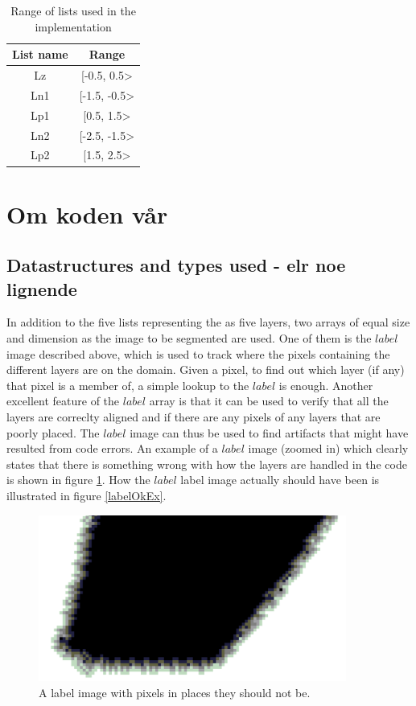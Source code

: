 \begin{table}[h] %
	\begin{tabular}{| c | c |} 
	\hline
	List name & Range\\
	\hline
	Lz & [-0.5, 0.5>\\
	Ln1 & [-1.5, -0.5>\\
	Lp1 & [0.5, 1.5>\\
	Ln2 & [-2.5, -1.5>\\
	Lp2 & [1.5, 2.5>\\
	\hline
	\end{tabular}
	\caption{Range of lists used in the implementation}
	\label{rangeTab2}
\end{table}


\section{Om koden vår}
\subsection{Datastructures and types used - elr noe lignende}
In addition to the five lists representing the as five layers, two arrays of equal size and dimension as the image to be segmented are used. One of them is the $label$ image described above, which is used to track where the pixels containing the different layers are on the domain. Given a pixel, to find out which layer (if any) that pixel is a member of, a simple lookup to the $label$ is enough. Another excellent feature of the $label$ array is that it can be used to verify that all the layers are correclty aligned and if there are any pixels of any layers that are poorly placed. The $label$ image can thus be used to find artifacts that might have resulted from code errors. An example of a $label$ image (zoomed in) which clearly states that there is something wrong with how the layers are handled in the code is shown in figure \ref{labelFailedEx}. How the $label$ label image actually should have been is illustrated in figure \ref{labelOkEx}.

\begin{figure}[h!]
\centering
\includegraphics[width=0.90\textwidth]{implemented/labelFailedEx}
\caption{A label image with pixels in places they should not be.}
\label{labelFailedEx}
\end{figure}


